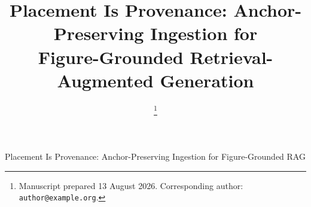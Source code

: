 \documentclass[journal]{IEEEtran}
\begin{document}
\title{Placement Is Provenance: Anchor-Preserving Ingestion for\\
Figure-Grounded Retrieval-Augmented Generation}

\author{%
\thanks{Manuscript prepared 13 August 2026. Corresponding author: \texttt{author@example.org}.}}

%
{Placement Is Provenance: Anchor-Preserving Ingestion for Figure-Grounded RAG}

\maketitle
\end{document}
